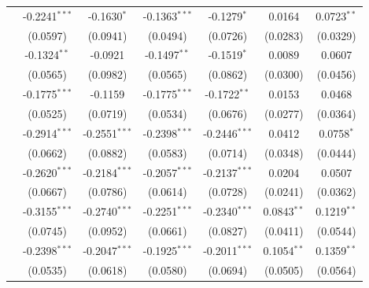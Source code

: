 \begin{tabular}{lcccccc}
   \qquad 2012                    & -0.2241$^{***}$       & -0.1630$^{*}$   & -0.1363$^{***}$       & -0.1279$^{*}$   & 0.0164         & 0.0723$^{**}$\\   
                                    & (0.0597)              & (0.0941)        & (0.0494)              & (0.0726)        & (0.0283)       & (0.0329)\\   
   \qquad 2013                    & -0.1324$^{**}$        & -0.0921         & -0.1497$^{**}$        & -0.1519$^{*}$   & 0.0089         & 0.0607\\   
                                    & (0.0565)              & (0.0982)        & (0.0565)              & (0.0862)        & (0.0300)       & (0.0456)\\   
   \qquad 2014                    & -0.1775$^{***}$       & -0.1159         & -0.1775$^{***}$       & -0.1722$^{**}$  & 0.0153         & 0.0468\\   
                                    & (0.0525)              & (0.0719)        & (0.0534)              & (0.0676)        & (0.0277)       & (0.0364)\\   
   \qquad 2015                    & -0.2914$^{***}$       & -0.2551$^{***}$ & -0.2398$^{***}$       & -0.2446$^{***}$ & 0.0412         & 0.0758$^{*}$\\   
                                    & (0.0662)              & (0.0882)        & (0.0583)              & (0.0714)        & (0.0348)       & (0.0444)\\   
   \qquad 2016                    & -0.2620$^{***}$       & -0.2184$^{***}$ & -0.2057$^{***}$       & -0.2137$^{***}$ & 0.0204         & 0.0507\\   
                                    & (0.0667)              & (0.0786)        & (0.0614)              & (0.0728)        & (0.0241)       & (0.0362)\\   
   \qquad 2017                    & -0.3155$^{***}$       & -0.2740$^{***}$ & -0.2251$^{***}$       & -0.2340$^{***}$ & 0.0843$^{**}$  & 0.1219$^{**}$\\   
                                    & (0.0745)              & (0.0952)        & (0.0661)              & (0.0827)        & (0.0411)       & (0.0544)\\   
   \qquad 2018                    & -0.2398$^{***}$       & -0.2047$^{***}$ & -0.1925$^{***}$       & -0.2011$^{***}$ & 0.1054$^{**}$  & 0.1359$^{**}$\\   
                                    & (0.0535)              & (0.0618)        & (0.0580)              & (0.0694)        & (0.0505)       & (0.0564)\\   

\end{tabular}
